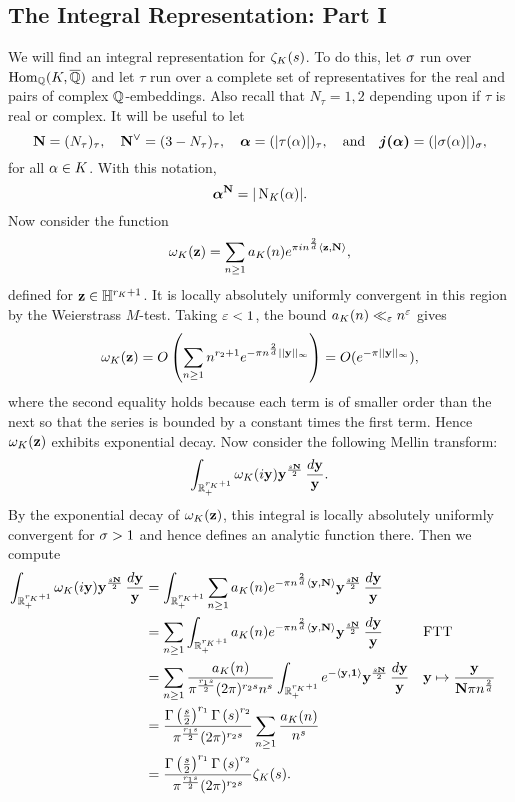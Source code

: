     \subsection*{The Integral Representation: Part I}
      We will find an integral representation for $\zeta_{K}(s)$. To do this, let $\sigma$ run over $\operatorname{\mathrm{Hom}}_{\mathbb{Q}}(K,\overline{\mathbb{Q}})$ and let $\tau$ run over a complete set of representatives for the real and pairs of complex $\mathbb{Q}$-embeddings. Also recall that $N_{\tau} = 1,2$ depending upon if $\tau$ is real or complex. It will be useful to let
      \[
        \mathbf{N} = (N_{\tau})_{\tau}, \quad \mathbf{N}^{\vee} = (3-N_{\tau})_{\tau}, \quad \boldsymbol{\alpha} = (|\tau(\alpha)|)_{\tau},  \quad \text{and} \quad \boldsymbol{j(\alpha)} = (|\sigma(\alpha)|)_{\sigma},
      \]
      for all $\alpha \in K$. With this notation,
      \[
        \boldsymbol{\alpha}^{\mathbf{N}} = |\operatorname{\mathrm{N}}_{K}(\alpha)|.
      \]
      Now consider the function
      \[
        \omega_{K}(\mathbf{z}) = \sum_{n \ge 1}a_{K}(n)e^{\pi in^{\frac{2}{d}}\langle\mathbf{z},\mathbf{N}\rangle},
      \]
      defined for $\mathbf{z} \in \mathbb{H}^{r_{K}+1}$. It is locally absolutely uniformly convergent in this region by the Weierstrass $M$-test. Taking $\varepsilon < 1$, the bound $a_{K}(n) \ll_{\varepsilon} n^{\varepsilon}$ gives
      \[
        \omega_{K}(\mathbf{z}) = O\left(\sum_{n \ge 1}n^{r_{2}+1}e^{-\pi n^{\frac{2}{d}}||\mathbf{y}||_{\infty}}\right) = O(e^{-\pi||\mathbf{y}||_{\infty}}),
      \]
      where the second equality holds because each term is of smaller order than the next so that the series is bounded by a constant times the first term. Hence $\omega_{K}(\mathbf{z})$ exhibits exponential decay. Now consider the following Mellin transform:
      \[
        \int_{\mathbb{R}_{+}^{r_{K}+1}}\omega_{K}(i\mathbf{y})\mathbf{y}^{\frac{s\mathbf{N}}{2}}\,\frac{d\mathbf{y}}{\mathbf{y}}.
      \]
      By the exponential decay of $\omega_{K}(\mathbf{z})$, this integral is locally absolutely uniformly convergent for $\sigma > 1$ and hence defines an analytic function there. Then we compute
      \begin{align*}
        \int_{\mathbb{R}_{+}^{r_{K}+1}}\omega_{K}(i\mathbf{y})\mathbf{y}^{\frac{s\mathbf{N}}{2}}\,\frac{d\mathbf{y}}{\mathbf{y}} &= \int_{\mathbb{R}_{+}^{r_{K}+1}}\sum_{n \ge 1}a_{K}(n)e^{-\pi n^{\frac{2}{d}}\langle\mathbf{y},\mathbf{N}\rangle}\mathbf{y}^{\frac{s\mathbf{N}}{2}}\,\frac{d\mathbf{y}}{\mathbf{y}} \\
        &= \sum_{n \ge 1}\int_{\mathbb{R}_{+}^{r_{K}+1}}a_{K}(n)e^{-\pi n^{\frac{2}{d}}\langle\mathbf{y},\mathbf{N}\rangle}\mathbf{y}^{\frac{s\mathbf{N}}{2}}\,\frac{d\mathbf{y}}{\mathbf{y}} && \text{FTT} \\
        &= \sum_{n \ge 1}\frac{a_{K}(n)}{\pi^{\frac{r_{1}s}{2}}(2\pi)^{r_{2}s}n^{s}}\int_{\mathbb{R}_{+}^{r_{K}+1}}e^{-\langle\mathbf{y},\mathbf{1}\rangle}\mathbf{y}^{\frac{s\mathbf{N}}{2}}\,\frac{d\mathbf{y}}{\mathbf{y}} && \text{$\mathbf{y} \mapsto \frac{\mathbf{y}}{\mathbf{N}\pi n^{\frac{2}{d}}}$} \\
        &= \frac{\Gamma\left(\frac{s}{2}\right)^{r_{1}}\Gamma\left(s\right)^{r_{2}}}{\pi^{\frac{r_{1}s}{2}}(2\pi)^{r_{2}s}}\sum_{n \ge 1}\frac{a_{K}(n)}{n^{s}} \\
        &= \frac{\Gamma\left(\frac{s}{2}\right)^{r_{1}}\Gamma\left(s\right)^{r_{2}}}{\pi^{\frac{r_{1}s}{2}}(2\pi)^{r_{2}s}}\zeta_{K}(s).
      \end{align*}
